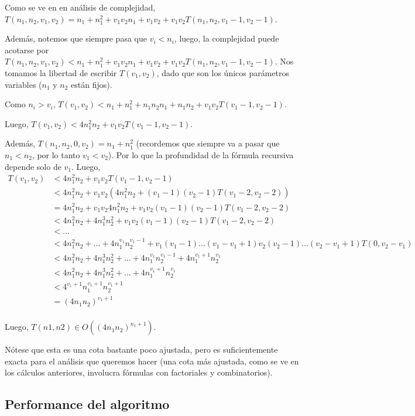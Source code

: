 Como se ve en en análisis de complejidad, $T(n_1, n_2, v_1, v_2) = n_1 + n_1^2 + v_1 v_2 n_1 + v_1 v_2 + v_1 v_2 T(n_1, n_2, v_1 - 1, v_2 - 1)$.

Además, notemos que siempre pasa que $v_i < n_i$, luego, la complejidad puede acotarse por $T(n_1, n_2, v_1, v_2) < n_1 + n_1^2 + v_1 v_2 n_1 + v_1 v_2 + v_1 v_2 T(n_1, n_2, v_1 - 1, v_2 - 1)$.
Nos tomamos la libertad de escribir $T(v_1, v_2)$, dado que son los únicos parámetros variables ($n_1$ y $n_2$ están fijos).


Como $n_i > v_i$, $T(v_1, v_2) < n_1 + n_1^2 + n_1 n_2 n_1 + n_1 n_2 + v_1 v_2 T(v_1 -1, v_2 - 1)$. 

Luego, $T(v_1, v_2) < 4 n_1^2 n_2 + v_1 v_2 T(v_1 -1, v_2 - 1)$.

Además, $T(n_1, n_2, 0, v_2) = n_1 + n_1^2$ (recordemos que siempre va a pasar que $n_1 < n_2$, por lo tanto $v_1 < v_2$). Por lo que la profundidad de la fórmula recursiva depende solo de $v_1$. Luego,
\[
\begin{array}{ll}
T(v_1, v_2) & < 4 n_1^2 n_2 + v_1 v_2 T(v_1 - 1, v_2 - 1) \\
  & < 4 n_1^2 n_2 + v_1 v_2 (4 n_1^2 n_2 + (v_1-1)(v_2-1) T(v_1-2,v_2-2)) \\
  & = 4 n_1^2 n_2 + v_1 v_2 4 n_1^2 n_2 + v_1 v_2 (v_1-1)(v_2-1)T(v_1-2,v_2-2) \\
  & < 4 n_1^2 n_2 + 4 n_1^3 n_2^2 + v_1 v_2 (v_1-1)(v_2-1)T(v_1-2,v_2-2) \\
  & < ... \\ 
  & < 4 n_1^2 n_2 + ... + 4 n_1^{v_1} n_2^{v_1 - 1} + v_1 (v_1 - 1) ... (v_1 - v_1 + 1)  v_2 (v_2 - 1) ... (v_2 - v_1 + 1) T(0, v_2 - v_1) \\ 
  & < 4 n_1^2 n_2 + 4 n_1^3 n_2^2 + ... + 4 n_1^{v_1} n_2^{v_1 - 1} + 4 n_1^{v_1 + 1} n_2^{v_1}  \\
  & < 4 n_1^2 n_2 + 4 n_1^3 n_2^2 + ... + 4 n_1^{v_1+1} n_2^{v_1} \\
  & < 4^{v_1 + 1} n_1^{v_1+1} n_2^{v_1 + 1} \\ 
  & = (4 n_1 n_2)^{v_1 + 1} \\
\end{array}
\]

Luego, $T(n1, n2) \in O((4 n_1 n_2)^{n_1 + 1})$.

Nótese que esta es una cota bastante poco ajustada, pero es suficientemente exacta para el análisis que queremos hacer (una cota más ajustada, como se ve en los cálculos anteriores, involucra fórmulas con factoriales y combinatorios).



\subsection{Performance del algoritmo}


